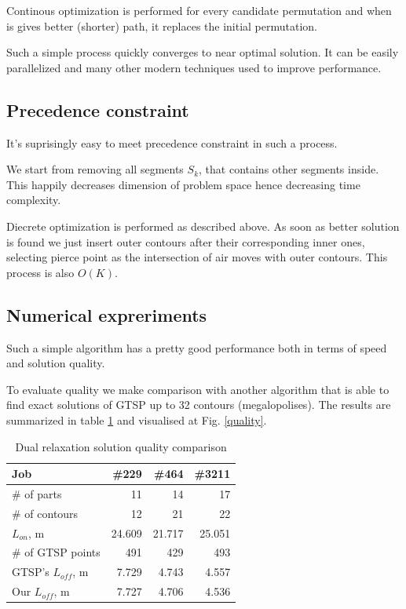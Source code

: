 \documentclass{../download/tPRS2e}
\begin{document}
Continous optimization is performed for every candidate permutation
and when is gives better
(shorter) path,
it replaces the initial permutation.

Such a simple process quickly converges to near optimal solution.
It can be easily parallelized and many other
modern techniques used to improve performance.

\subsection{Precedence constraint}

It's suprisingly easy to meet precedence constraint in such a process.

We start from removing all segments $S_k$,
that contains other segments inside.
This happily decreases dimension of problem space
hence decreasing time complexity.

Diecrete optimization is performed as described above.
As soon as better solution is found we just
insert outer contours after their corresponding inner ones,
selecting pierce point as the intersection of air moves with
outer contours.
This process is also $O(K)$.

\subsection{Numerical expreriments}

Such a simple algorithm has a pretty good performance
both in terms of speed and solution quality.

To evaluate quality
we make comparison with another algorithm
that is able to find exact solutions of GTSP
up to 32 contours (megalopolises).
The results are summarized in table \ref{exact-3}
and visualised at Fig. \ref{quality}.

\begin{table}[h]
    \begin{center}    
    \begin{tabular}{l|*{3}{r}}
        Job & \#229 & \#464 & \#3211 \\
        \hline
        \# of parts & 11 & 14 & 17\\
        \# of contours & 12 & 21 & 22 \\
        $L_{on}$, m & 24.609 & 21.717 & 25.051 \\
        \# of GTSP points & 491 & 429 & 493 \\
        GTSP's $L_{off}$, m & 7.729 & 4.743 & 4.557 \\
        Our $L_{off}$, m & 7.727 & 4.706 & 4.536 \\
    \end{tabular}
    \caption{Dual relaxation solution quality comparison}
    \label{exact-3}
    \end{center}
    \end{table}
\end{document}

